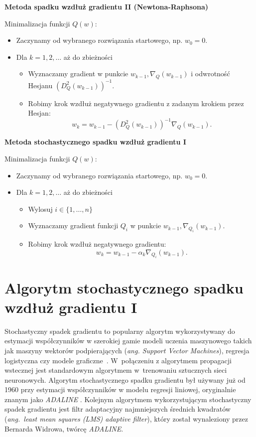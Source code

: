 \begin{center}
\textbf{Metoda spadku wzdłuż gradientu II (Newtona-Raphsona)}
\end{center}
Minimalizacja funkcji $Q(w)$:
\begin{itemize}
\item Zaczynamy od wybranego rozwiązania startowego, np. $w_{0} = 0$.
\item Dla $k = 1, 2, \dots$ aż do zbieżności
	\begin{itemize}
	\item Wyznaczamy gradient w punkcie $w_{k-1}, \nabla_{Q}(w_{k-1})$ i odwrotność Hesjanu $(D_{Q}^{2}(w_{k-1}))^{-1}$.
	\item Robimy krok wzdłuż negatywnego gradientu z zadanym krokiem przez Hesjan: 
	\begin{equation}\label{NJU-rap}
	 w_{k} = w_{k-1} - (D_{Q}^{2}(w_{k-1}))^{-1}\nabla_{Q}(w_{k-1}). 
	 \end{equation}	
	\end{itemize}
\end{itemize}
\begin{center}
\textbf{Metoda stochastycznego spadku wzdłuż gradientu I}
\end{center}
Minimalizacja funkcji $Q(w)$:
\begin{itemize}
\item Zaczynamy od wybranego rozwiązania startowego, np. $w_{0} = 0$.
\item Dla $k = 1, 2, \dots$ aż do zbieżności
	\begin{itemize}
	\item Wylosuj $i \in \{1,\dots,n\}$
	\item Wyznaczamy gradient funkcji $Q_{i}$ w punkcie $w_{k-1}, \nabla_{Q_{i}}(w_{k-1})$.
	\item Robimy krok wzdłuż negatywnego gradientu: 
	\begin{equation}\label{sgdrownanie}
	 w_{k} = w_{k-1} - \alpha_{k}\nabla_{Q_{i}}(w_{k-1}).
	  \end{equation}
	\end{itemize}
\end{itemize}

\section{Algorytm stochastycznego spadku wzdłuż gradientu I}\label{SGD}
Stochastyczny spadek gradientu to popularny algorytm wykorzystywany do estymacji współczynników w szerokiej gamie modeli uczenia maszynowego takich jak maszyny wektorów podpierających (\textit{ang. Support Vector Machines}), regresja logistyczna czy modele graficzne~\cite{finkel}. W~połączeniu z algorytmem propagacji wstecznej jest standardowym algorytmem w~trenowaniu sztucznych sieci neuronowych. Algorytm stochastycznego spadku gradientu był używany już od 1960 przy estymacji współczynników w modelu regresji liniowej, oryginalnie znanym jako \textit{ADALINE} \cite{ADALINE}. Kolejnym algorytmem wykorzystującym stochastyczny spadek gradientu jest filtr adaptacyjny najmniejszych średnich kwadratów \cite{widrow2} (\textit{ang.~least mean squares (LMS) adaptive filter}), który został wynaleziony przez Bernarda Widrowa, twórcę \textit{ADALINE}.

